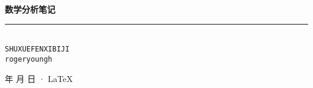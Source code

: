 \documentclass[cn,11pt,blue,normal,founder]{elegantbook}
\begin{document}
\newcommand\mfrac[2]{\dfrac{#1\smash[b]{\strut}}{#2\smash[t]{\strut}}}
\newcommand\RR{\mathbb{R}}
\newcommand\NN{\mathbb{N}}
\newcommand\QQ{\mathbb{Q}}
\newcommand\ee{\mathrm{e}}
\newcommand\dd{\mathrm{d}}
\newcommand\uppi{\mathrm{\pi}}
\newcommand\num[1]{{\textit{（}}{\rm{#1}}{\textit{）}}}

\begin{titlepage}
    \vspace*{25ex}%
    \begin{minipage}{.9\textwidth}
    \flushright
        {\textbf{数学分析笔记}}\\%
        \rule{\linewidth}{1pt}\\ \vspace{2ex}
        {\texttt{SHUXUEFENXIBIJI}} \\%
        \vspace{20ex}%
        {\texttt{rogeryoungh}}%
    \end{minipage}
    \vfill\centering
    {\number\year 年 \number\month 月 \number\day 日 · \LaTeX{}}
\end{titlepage}
\clearpage{\hypersetup{hidelinks}\tableofcontents}

\clearpage

\end{document}
